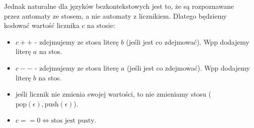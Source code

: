 \documentclass{article}
\theoremstyle{definition}
\theoremstyle{remark}
\begin{document}
Jednak naturalne dla języków bezkontekstowych jest to, że są rozpoznawane przez automaty ze stosem, a nie automaty z licznikiem.
Dlatego będziemy kodować wartość licznika \(c\) na stosie:
\begin{itemize}
\item \(c++\) - zdejmujemy ze stosu literę \(b\) (jeśli jest co zdejmować). Wpp dodajemy literę \(a\) na stos.
\item \(c--\) - zdejmujemy ze stosu literę \(a\) (jeśli jest co zdejmować). Wpp dodajemy literę \(b\) na stos.
\item jeśli licznik nie zmienia swojej wartości, to nie zmieniamy stosu (\(\text{pop}(\epsilon), \text{push}(\epsilon)\)).
\item \(c == 0 \iff \text{stos jest pusty}\).
\end{itemize}
\end{document}
